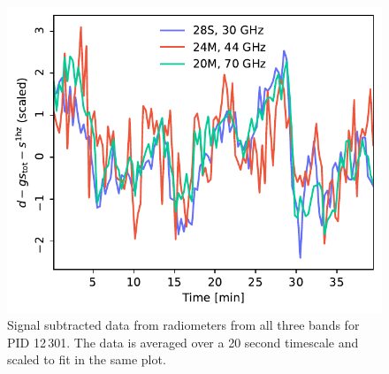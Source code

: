 \documentclass{aa}
\begin{document}
\begin{figure}
        \begin{center}
                \includegraphics[width=\linewidth]{figs/ncorr_compare_12301.pdf}
        \end{center}
        \caption{Signal subtracted data from radiometers from all three bands for PID 12\,301. The data is averaged over a 20 second timescale and scaled to fit in the same plot. 
                \label{fig:data_compare_corr}}
\end{figure}
\end{document}
